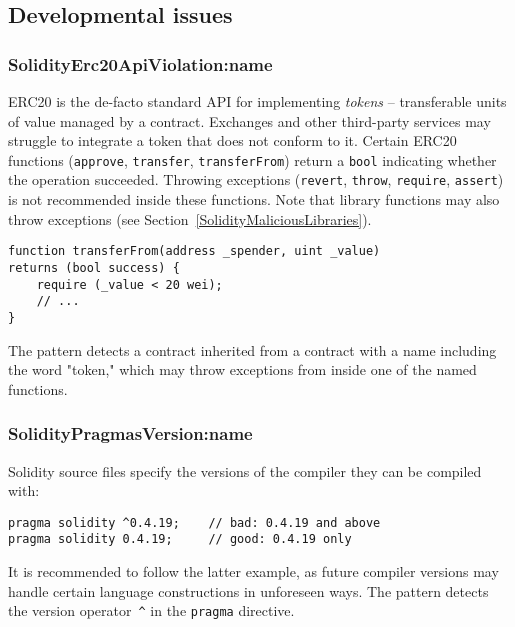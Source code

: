\subsection{Developmental issues} \label{sec:DevelopmentalIssues}

\subsubsection{\usevalue SolidityErc20ApiViolation:name } \label{SolidityErc20ApiViolation}

ERC20 is the de-facto standard API for implementing \textit{tokens} -- transferable units of value managed by a contract.
Exchanges and other third-party services may struggle to integrate a token that does not conform to it.
Certain ERC20 functions (\texttt{approve}, \texttt{transfer}, \texttt{transferFrom}) return a \texttt{bool} indicating whether the operation succeeded.
Throwing exceptions (\texttt{revert}, \texttt{throw}, \texttt{require}, \texttt{assert}) is not recommended inside these functions.
Note that library functions may also throw exceptions (see Section~\ref{SolidityMaliciousLibraries}).

\begin{lstlisting}[language=Solidity]
function transferFrom(address _spender, uint _value)
returns (bool success) {
	require (_value < 20 wei);
	// ...
}
\end{lstlisting}

The pattern detects a contract inherited from a contract with a name including the word "token," which may throw exceptions from inside one of the named functions.

\subsubsection{\usevalue SolidityPragmasVersion:name } \label{SolidityPragmasVersion}

Solidity source files specify the versions of the compiler they can be compiled with:
\begin{lstlisting}[language=Solidity]
pragma solidity ^0.4.19;	// bad: 0.4.19 and above
pragma solidity 0.4.19;		// good: 0.4.19 only
\end{lstlisting}
It is recommended to follow the latter example, as future compiler versions may handle certain language constructions in unforeseen ways.
The pattern detects the version operator~\texttt{\^{}} in the \texttt{pragma} directive.

